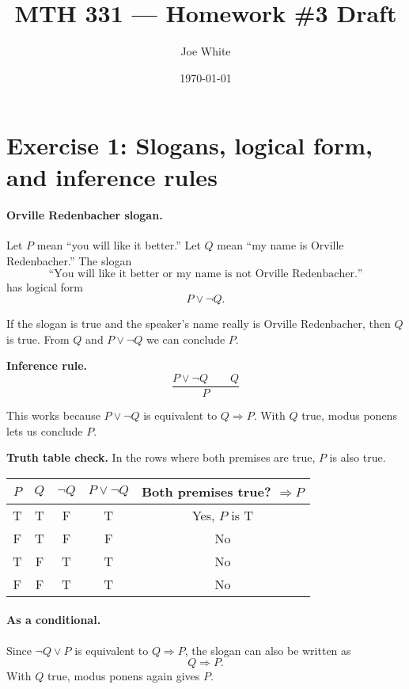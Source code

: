 \documentclass[11pt]{article}
\title{MTH 331 — Homework \#3 Draft}
\author{Joe White}
\date{\today}
\begin{document}
\maketitle

\section*{Exercise 1: Slogans, logical form, and inference rules}

\paragraph{Orville Redenbacher slogan.}
Let $P$ mean “you will like it better.” Let $Q$ mean “my name is Orville Redenbacher.”  
The slogan
\[
\text{``You will like it better or my name is not Orville Redenbacher.''}
\]
has logical form
\[
P \lor \neg Q.
\]

If the slogan is true and the speaker’s name really is Orville Redenbacher, then $Q$ is true. From $Q$ and $P\lor\neg Q$ we can conclude $P$.

\medskip
\noindent\textbf{Inference rule.}
\[
\frac{P\lor\neg Q \quad\quad Q}{P}
\]

This works because $P\lor\neg Q$ is equivalent to $Q\Rightarrow P$. With $Q$ true, modus ponens lets us conclude $P$.

\medskip
\noindent\textbf{Truth table check.}  
In the rows where both premises are true, $P$ is also true.

\begin{center}
\renewcommand{\arraystretch}{1.15}
\begin{tabular}{|c|c||c|c||c|}
\hline
$P$ & $Q$ & $\neg Q$ & $P\lor\neg Q$ & Both premises true? $\Rightarrow P$ \\
\hline
T & T & F & T & Yes, $P$ is T \\
F & T & F & F & No \\
T & F & T & T & No \\
F & F & T & T & No \\
\hline
\end{tabular}
\end{center}

\paragraph{As a conditional.}
Since $\neg Q \lor P$ is equivalent to $Q \Rightarrow P$, the slogan can also be written as
\[
Q \Rightarrow P.
\]
With $Q$ true, modus ponens again gives $P$.
\end{document}

